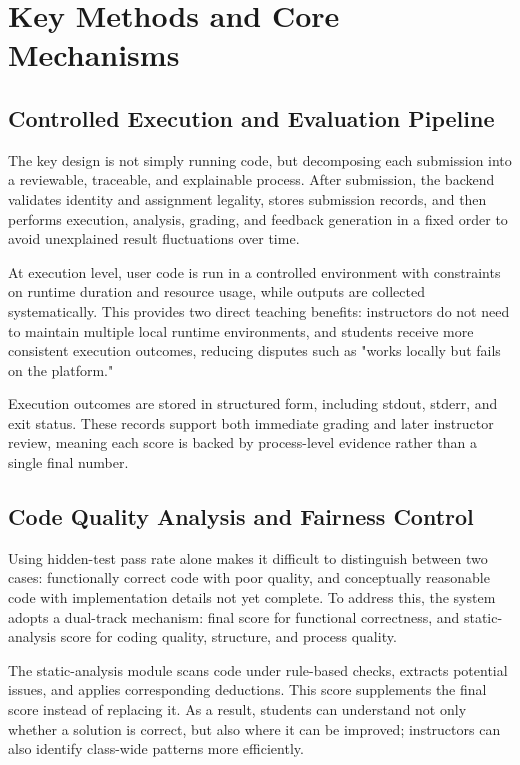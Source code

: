 ﻿\chapter{Key Methods and Core Mechanisms}


\section{Controlled Execution and Evaluation Pipeline}

The key design is not simply running code, but decomposing each submission into a reviewable, traceable, and explainable process. After submission, the backend validates identity and assignment legality, stores submission records, and then performs execution, analysis, grading, and feedback generation in a fixed order to avoid unexplained result fluctuations over time.

At execution level, user code is run in a controlled environment with constraints on runtime duration and resource usage, while outputs are collected systematically. This provides two direct teaching benefits: instructors do not need to maintain multiple local runtime environments, and students receive more consistent execution outcomes, reducing disputes such as "works locally but fails on the platform."

Execution outcomes are stored in structured form, including stdout, stderr, and exit status. These records support both immediate grading and later instructor review, meaning each score is backed by process-level evidence rather than a single final number.

\section{Code Quality Analysis and Fairness Control}

Using hidden-test pass rate alone makes it difficult to distinguish between two cases: functionally correct code with poor quality, and conceptually reasonable code with implementation details not yet complete. To address this, the system adopts a dual-track mechanism: final score for functional correctness, and static-analysis score for coding quality, structure, and process quality.

The static-analysis module scans code under rule-based checks, extracts potential issues, and applies corresponding deductions. This score supplements the final score instead of replacing it. As a result, students can understand not only whether a solution is correct, but also where it can be improved; instructors can also identify class-wide patterns more efficiently.

